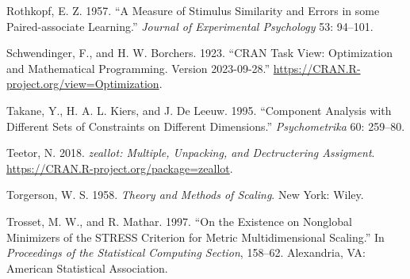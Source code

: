 \documentclass[
  12pt,
]{article}
\newlength{\cslhangindent}
\newenvironment{CSLReferences}[2] %
 {\begin{list}{}{%
  \setlength{\itemindent}{0pt}
  \setlength{\leftmargin}{0pt}
  \setlength{\parsep}{0pt}
  \ifodd #1
   \setlength{\leftmargin}{\cslhangindent}
   \setlength{\itemindent}{-1\cslhangindent}
  \fi
  \setlength{\itemsep}{#2\baselineskip}}}
 {\end{list}}
\begin{document}
\begin{CSLReferences}{1}{0}
Rothkopf, E. Z. 1957. {``{A Measure of Stimulus Similarity and Errors in some Paired-associate Learning}.''} \emph{Journal of Experimental Psychology} 53: 94--101.

Schwendinger, F., and H. W. Borchers. 1923. {``CRAN Task View: Optimization and Mathematical Programming. Version 2023-09-28.''} \url{https://CRAN.R-project.org/view=Optimization}.

Takane, Y., H. A. L. Kiers, and J. De Leeuw. 1995. {``Component Analysis with Different Sets of Constraints on Different Dimensions.''} \emph{Psychometrika} 60: 259--80.

Teetor, N. 2018. \emph{{zeallot: Multiple, Unpacking, and Dectructering Assigment}}. \url{https://CRAN.R-project.org/package=zeallot}.

Torgerson, W. S. 1958. \emph{{Theory and Methods of Scaling}}. New York: Wiley.

Trosset, M. W., and R. Mathar. 1997. {``{On the Existence on Nonglobal Minimizers of the STRESS Criterion for Metric Multidimensional Scaling}.''} In \emph{Proceedings of the Statistical Computing Section}, 158--62. Alexandria, VA: American Statistical Association.

\end{CSLReferences}
\end{document}
